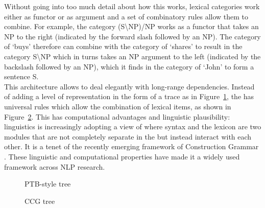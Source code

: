 \documentclass[output=paper]{langsci/langscibook}
\begin{document}
\indent Without going into too much detail about how this works, lexical categories work either as functor or as argument and a set of combinatory rules allow them to combine. For example, the category (S\textbackslash NP)/NP works as a functor that takes an NP to the right (indicated by the forward slash followed by an NP). The category of `buys' therefore can combine with the category of `shares' to result in the category S\textbackslash NP which in turns takes an NP argument to the left (indicated by the backslash followed by an NP), which it finds in the category of `John' to form a sentence S.\\
\indent This  architecture allows  to deal elegantly with long-range dependencies. Instead of adding a level of representation in the form of a trace as in Figure~\ref{del:fig:3}, the  has universal rules which allow the combination of lexical items, as shown in Figure~\ref{del:fig:4}. This has computational advantages and linguistic plausibility: linguistics is increasingly adopting a view of  where syntax and the lexicon are two modules that are not completely separate in the  but instead interact with each other. It is a tenet of the recently emerging framework of Construction Grammar \citep{hoffmann2013}. These linguistic and computational properties have made it a widely used framework across NLP research.
\begin{figure}[h]
\caption{PTB-style tree\label{del:fig:3}}
\end{figure}

\begin{figure}[h]
\caption{CCG tree\label{del:fig:4}} 
\end{figure}
\end{document}
